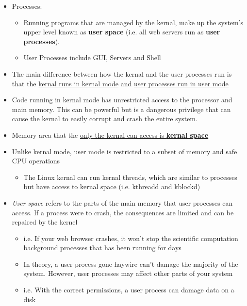 \documentclass{article}
\begin{document}
\begin{itemize}
\begin{itemize}
			\item Processes:
				\begin{itemize}
					\item Running programs that are managed by the kernal, make up the system's upper level known as {\bf user space} (i.e. all web servers run as {\bf user processes}).
					\item User Processes include GUI, Servers and Shell
				\end{itemize}
			
			\item The main difference between how the kernal and the user processes run is that the \underline{kernal runs in kernal mode} and \underline{user processes run in user mode}
			
			\item Code running in kernal mode has unrestricted access to the processor and main memory. This can be powerful but is a dangerous privilege that can cause the kernal to easily corrupt and crash the entire system. 
			
			\item Memory area that the \underline{only the kernal can access is {\bf kernal space}}
			
			\item Unlike kernal mode, user mode is restricted to a subset of memory and safe CPU operations
			
			\begin{itemize}
				\item The Linux kernal can run kernal threads, which are similar to processes but have access to kernal space (i.e. kthreadd and kblockd)
			\end{itemize}
			
			\item \textit{User space} refers to the parts of the main memory that user processes can access. If a process were to crash, the consequences are limited and can be repaired by the kernel
			
				\begin{itemize}
					\item i.e. If your web browser crashes, it won't stop the scientific computation background processes that has been running for days
					\item In theory, a user process gone haywire can't damage the majority of the system. However, user processes may affect other parts of your system
					\item i.e. With the correct permissions, a user process can damage data on a disk
				\end{itemize}
				
		\end{itemize}
	\end{itemize}
\end{document}
